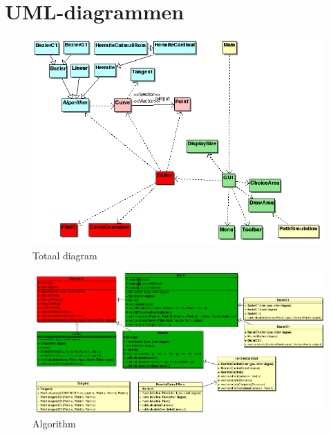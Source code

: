 \documentclass[a4paper,11pt,oneside, titlepage]{article}
\begin{document}
\section{UML-diagrammen}
\begin{figure}[htbp]
\centering
\includegraphics[scale=0.6]{./UML2/Total.png}
\caption{Totaal diagram}\label{iTot}
\end{figure}
\begin{figure}[htbp]
\centering
\includegraphics[scale=0.45]{./UML2/Alg.png}
\caption{Algorithm}\label{iAlg}
\end{figure}
\end{document}
